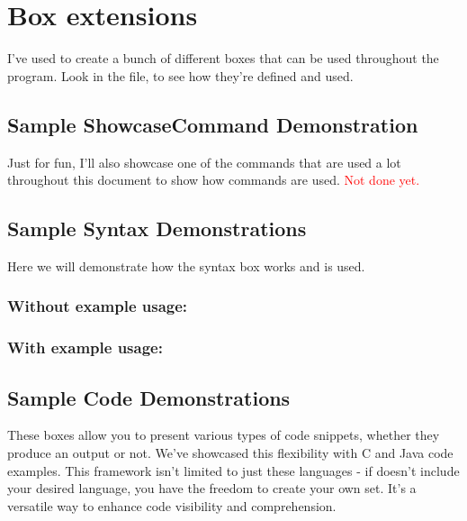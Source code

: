 \section{Box extensions}

I've used  to create a bunch of different boxes that can be used throughout the program. Look in the  file, to see how they're defined and used.

\subsection{Sample ShowcaseCommand Demonstration}
Just for fun, I'll also showcase one of the commands that are used a lot throughout this document to show how commands are used.
\textcolor{red}{Not done yet.}
\subsection{Sample Syntax Demonstrations}
Here we will demonstrate how the syntax box works and is used. 

\subsubsection*{Without example usage:}


\subsubsection*{With example usage:}


\subsection{Sample Code Demonstrations}
These boxes allow you to present various types of code snippets, whether they produce an output or not. We've showcased this flexibility with C and Java code examples. This framework isn't limited to just these languages - if  doesn't include your desired language, you have the freedom to create your own set. It's a versatile way to enhance code visibility and comprehension.


